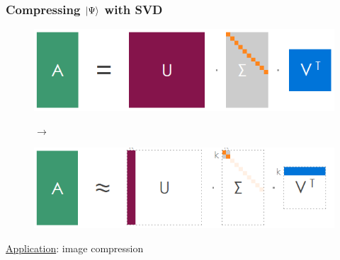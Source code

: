 \documentclass{beamer}
\theoremstyle{definition}
\begin{document}
\begin{frame}
	\frametitle{Compressing $\ket{\Psi}$ with SVD}
	
	
	
	\begin{figure}[!htb]
		\centering
		\begin{minipage}{0.45\textwidth}
			\centering
			\includegraphics[scale=0.34]{svd1.png}
		\end{minipage}
	$\to$
		\begin{minipage}{0.45\textwidth}
			\centering
			\includegraphics[scale=0.34]{svd2.png}
		\end{minipage}
	\end{figure}

\pause

\vspace{10pt}

\underline{Application}: image compression


\end{frame}
\end{document}
